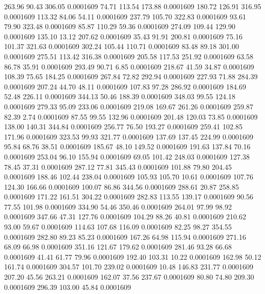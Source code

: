  263.96   90.43  306.05   0.0001609
  74.71  113.54  173.88   0.0001609
 180.72  126.91  316.95   0.0001609
 113.32   84.06   54.11   0.0001609
 237.79  105.70  322.83   0.0001609
  93.61   79.90  323.48   0.0001609
  85.87  110.29   59.36   0.0001609
 274.09  109.44  129.90   0.0001609
 135.10   13.12  207.62   0.0001609
  35.43   91.91  200.81   0.0001609
  75.16  101.37  321.63   0.0001609
 302.24  105.44  110.71   0.0001609
  83.48   89.18  301.00   0.0001609
 275.51  113.42  316.38   0.0001609
 205.58  117.53  251.92   0.0001609
  63.58   86.78   35.91   0.0001609
 293.49   90.71    6.85   0.0001609
 218.67   41.59   34.87   0.0001609
 108.39   75.65  184.25   0.0001609
 267.84   72.82  292.94   0.0001609
 227.93   71.88  284.39   0.0001609
 207.24   44.70   48.11   0.0001609
 107.83   97.28  286.92   0.0001609
 184.69   52.48  226.11   0.0001609
 344.13   50.46  188.39   0.0001609
 348.03   99.55  124.18   0.0001609
 279.33   95.09  233.06   0.0001609
 219.08  169.67  261.26   0.0001609
 259.87   82.39    2.74   0.0001609
  87.55   99.55  132.96   0.0001609
 201.48  120.03   73.85   0.0001609
 138.00  140.31  344.84   0.0001609
 256.77   76.50  193.27   0.0001609
 259.41  102.85  171.96   0.0001609
 323.53   99.93  321.77   0.0001609
 137.69  137.45  224.99   0.0001609
  95.84   68.76   38.51   0.0001609
 185.67   48.10  149.52   0.0001609
 191.63  137.84   70.16   0.0001609
 253.04   96.10  155.94   0.0001609
  69.05  101.42  248.03   0.0001609
 127.38   78.45   37.31   0.0001609
 287.12   77.81  345.43   0.0001609
 101.88   79.80  204.45   0.0001609
 188.46  102.44  238.04   0.0001609
 105.93  105.70   10.61   0.0001609
 107.76  124.30  166.66   0.0001609
 100.07   86.86  344.56   0.0001609
 288.61   20.87  258.85   0.0001609
 171.22  161.51  304.22   0.0001609
 282.83  113.55  139.17   0.0001609
  90.56   77.55  101.98   0.0001609
 334.90   54.46  350.46   0.0001609
 264.01   97.99   98.92   0.0001609
 347.66   47.31  127.76   0.0001609
 104.29   88.26   40.81   0.0001609
 210.62   93.00   59.67   0.0001609
 114.63  107.68  116.09   0.0001609
  82.25   98.27  354.55   0.0001609
 282.80   89.23   85.23   0.0001609
 167.26   64.98  115.94   0.0001609
 271.16   68.09   66.98   0.0001609
 351.16  121.67  179.62   0.0001609
 281.46   93.28   66.68   0.0001609
  41.41   61.77   79.96   0.0001609
 192.40  103.31   10.22   0.0001609
 162.98   50.12  161.74   0.0001609
 304.57  101.70  239.02   0.0001609
  10.48  146.83  231.77   0.0001609
 207.20   45.56  263.21   0.0001609
 162.07   37.56  237.67   0.0001609
  80.80   74.80  209.30   0.0001609
 296.39  103.00   45.84   0.0001609
